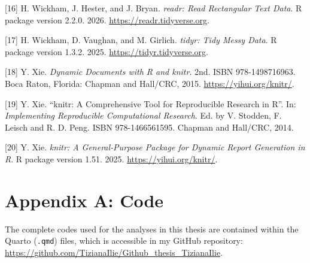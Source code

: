 \documentclass[
  letterpaper,
  DIV=11,
  numbers=noendperiod]{scrartcl}
\begin{document}
{[}16{]} H. Wickham, J. Hester, and J. Bryan. \emph{readr: Read
Rectangular Text Data}. R package version 2.2.0. 2026.
\url{https://readr.tidyverse.org}.

{[}17{]} H. Wickham, D. Vaughan, and M. Girlich. \emph{tidyr: Tidy Messy
Data}. R package version 1.3.2. 2025. \url{https://tidyr.tidyverse.org}.

{[}18{]} Y. Xie. \emph{Dynamic Documents with R and knitr}. 2nd. ISBN
978-1498716963. Boca Raton, Florida: Chapman and Hall/CRC, 2015.
\url{https://yihui.org/knitr/}.

{[}19{]} Y. Xie. ``knitr: A Comprehensive Tool for Reproducible Research
in R''. In: \emph{Implementing Reproducible Computational Research}. Ed.
by V. Stodden, F. Leisch and R. D. Peng. ISBN 978-1466561595. Chapman
and Hall/CRC, 2014.

{[}20{]} Y. Xie. \emph{knitr: A General-Purpose Package for Dynamic
Report Generation in R}. R package version 1.51. 2025.
\url{https://yihui.org/knitr/}.

\newpage{}

\section*{Appendix A: Code}\label{appendix-a-code}

The complete codes used for the analyses in this thesis are contained
within the Quarto (\texttt{.qmd}) files, which is accessible in my
GitHub repository:
\url{https://github.com/TizianaIlie/Github_thesis_TizianaIlie}.
\end{document}
